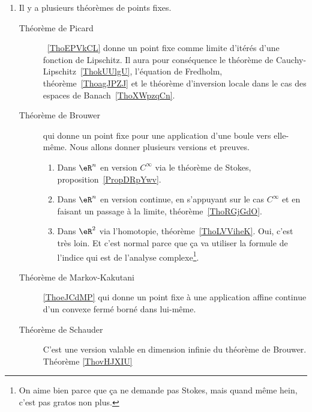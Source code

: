         \label{THEMEooWAYJooUSnmMh}
\begin{enumerate}
	\item
	      Il y a plusieurs théorèmes de points fixes.
	      \begin{description}
		      \item[Théorème de Picard]~\ref{ThoEPVkCL} donne un point fixe comme limite d'itérés d'une fonction de Lipschitz. Il aura pour conséquence le théorème de Cauchy-Lipschitz~\ref{ThokUUlgU}, l'équation de Fredholm, théorème~\ref{ThoagJPZJ} et le théorème d'inversion locale dans le cas des espaces de Banach~\ref{ThoXWpzqCn}.
		      \item[Théorème de Brouwer] qui donne un point fixe pour une application d'une boule vers elle-même. Nous allons donner plusieurs versions et preuves.
			      \begin{enumerate}
				      \item
				            Dans \( \eR^n\) en version \( C^{\infty}\) via le théorème de Stokes, proposition~\ref{PropDRpYwv}.
				      \item
				            Dans \( \eR^n\) en version continue, en s'appuyant sur le cas \( C^{\infty}\) et en faisant un passage à la limite, théorème~\ref{ThoRGjGdO}.
				      \item
				            Dans \( \eR^2\) via l'homotopie, théorème~\ref{ThoLVViheK}. Oui, c'est très loin. Et c'est normal parce que ça va utiliser la formule de l'indice qui est de l'analyse complexe\footnote{On aime bien parce que ça ne demande pas Stokes, mais quand même hein, c'est pas gratos non plus.}.
			      \end{enumerate}
			      \item[Théorème de Markov-Kakutani]\ref{ThoeJCdMP} qui donne un point fixe à une application affine continue d'un convexe fermé borné dans lui-même.
		      \item[Théorème de Schauder] C'est une version valable en dimension infinie du théorème de Brouwer. Théorème \ref{ThovHJXIU}
	      \end{description}


\end{enumerate}
